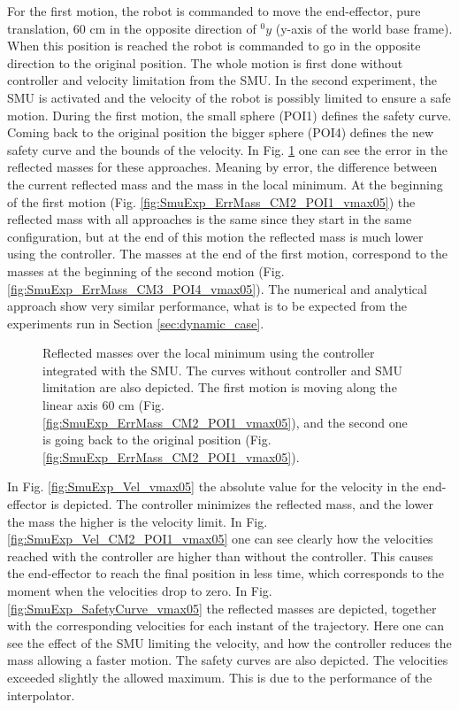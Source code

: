 For the first motion, the robot is commanded to move the end-effector, pure translation, 60 cm in the opposite direction of ${}^{0}_{}y$  (y-axis of the world base frame). When this position is reached the robot is commanded to go in the opposite direction to the original position.
The whole motion is first done without controller and velocity limitation from the SMU. In the second experiment, the SMU is activated and the velocity of the robot is possibly limited to ensure a safe motion. During the first motion, the small sphere (POI1) defines the safety curve. Coming back to the original position the bigger sphere (POI4) defines the new safety curve and the bounds of the velocity.
In  Fig. \ref{fig:SmuExp_ErrMass_vmax05} one can see the error in the reflected masses for these approaches. Meaning by error, the difference between the current reflected mass and the mass in the local minimum. At the beginning of the first motion (Fig. \ref{fig:SmuExp_ErrMass_CM2_POI1_vmax05}) the reflected mass with all approaches is the same since they start in the same configuration, but at the end of this motion the reflected mass is much lower using the controller. The masses at the end of the first motion, correspond to the masses at the beginning of the second motion (Fig. \ref{fig:SmuExp_ErrMass_CM3_POI4_vmax05}). The numerical and analytical approach show very similar performance, what is to be expected from the experiments run in Section \ref{sec:dynamic_case}.
%
%
%
\begin{figure}[htb!]
	\centering	
	 	 	
	\caption{Reflected masses over the local minimum using the controller integrated with the SMU. The curves without controller and  SMU limitation are also depicted. The first motion is moving along the linear axis 60 cm (Fig. \ref{fig:SmuExp_ErrMass_CM2_POI1_vmax05}), and the second one is going back to the original position (Fig. \ref{fig:SmuExp_ErrMass_CM2_POI1_vmax05}).}
	\label{fig:SmuExp_ErrMass_vmax05}
\end{figure}
%
%
In Fig. \ref{fig:SmuExp_Vel_vmax05} the absolute value for the velocity in the end-effector is depicted. The controller minimizes the reflected mass, and the lower the mass the higher is the velocity limit. In Fig. \ref{fig:SmuExp_Vel_CM2_POI1_vmax05} one can see clearly how the velocities reached with the controller are higher than without the controller. This causes the end-effector to reach the final position in less time, which corresponds to the moment when the velocities drop to zero.
In Fig. \ref{fig:SmuExp_SafetyCurve_vmax05} the reflected masses are depicted, together with the corresponding velocities for each instant of the trajectory. Here one can see the effect of the SMU limiting the velocity, and how the controller reduces the mass allowing a faster motion. The safety curves are also depicted.
%
The velocities exceeded slightly  the allowed maximum. This is due to the performance of the interpolator.

